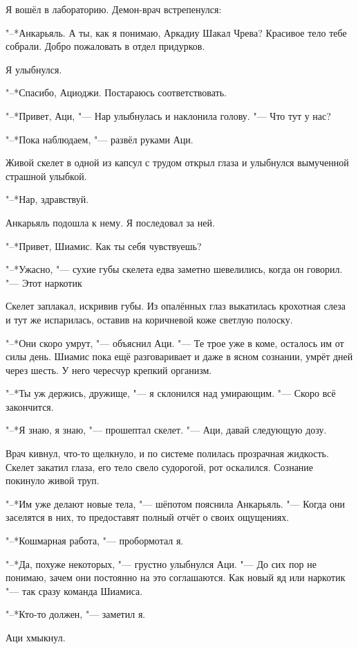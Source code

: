 \documentclass[a4paper,10pt,fleqn]{book}
\newcommand{\ldotst}{\so{...}\xspace}
\begin{document}
Я вошёл в лабораторию.
Демон-врач встрепенулся:

"--*Анкарьяль.
А ты, как я понимаю, Аркадиу Шакал Чрева?
Красивое тело тебе собрали.
Добро пожаловать в отдел придурков.

Я улыбнулся.

"--*Спасибо, Ациоджи.
Постараюсь соответствовать.

"--*Привет, Аци, "--- Нар улыбнулась и наклонила голову.
"--- Что тут у нас?

"--*Пока наблюдаем, "--- развёл руками Аци.

Живой скелет в одной из капсул с трудом открыл глаза и улыбнулся вымученной страшной улыбкой.

"--*Нар, здравствуй.

Анкарьяль подошла к нему.
Я последовал за ней.

"--*Привет, Шиамис.
Как ты себя чувствуешь?

"--*Ужасно, "--- сухие губы скелета едва заметно шевелились, когда он говорил.
"--- Этот наркотик\ldotst

Скелет заплакал, искривив губы.
Из опалённых глаз выкатилась крохотная слеза и тут же испарилась, оставив на коричневой коже светлую полоску.

"--*Они скоро умрут, "--- объяснил Аци.
"--- Те трое уже в коме, осталось им от силы день.
Шиамис пока ещё разговаривает и даже в ясном сознании, умрёт дней через шесть.
У него чересчур крепкий организм.

"--*Ты уж держись, дружище, "--- я склонился над умирающим.
"--- Скоро всё закончится.

"--*Я знаю, я знаю, "--- прошептал скелет.
"--- Аци, давай следующую дозу.

Врач кивнул, что-то щелкнуло, и по системе полилась прозрачная жидкость.
Скелет закатил глаза, его тело свело судорогой, рот оскалился.
Сознание покинуло живой труп.

"--*Им уже делают новые тела, "--- шёпотом пояснила Анкарьяль.
"--- Когда они заселятся в них, то предоставят полный отчёт о своих ощущениях.

"--*Кошмарная работа, "--- пробормотал я.

"--*Да, похуже некоторых, "--- грустно улыбнулся Аци.
"--- До сих пор не понимаю, зачем они постоянно на это соглашаются.
Как новый яд или наркотик "--- так сразу команда Шиамиса.

"--*Кто-то должен, "--- заметил я.

Аци хмыкнул.
\end{document}
